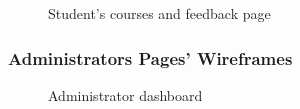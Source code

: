 \begin{figure}[H]
    \centering
    \caption{Student's courses and feedback page}
    \label{fig:stu_course_feedback}
\end{figure}


\subsubsection{Administrators Pages' Wireframes}
\begin{figure}[H]
    \centering
    \caption{Administrator dashboard}
    \label{fig:admin_dash}
\end{figure}

